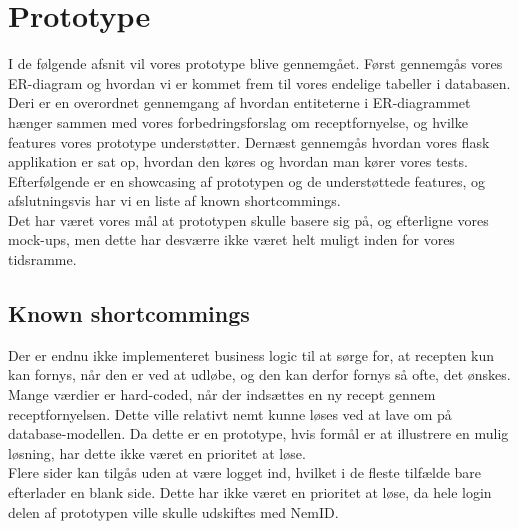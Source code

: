 \section{Prototype}
I de følgende afsnit vil vores prototype blive gennemgået. Først gennemgås vores ER-diagram og hvordan vi er kommet frem til vores endelige tabeller i databasen. Deri er en overordnet gennemgang af hvordan entiteterne i ER-diagrammet hænger sammen med vores forbedringsforslag om receptfornyelse, og hvilke features vores prototype understøtter. Dernæst gennemgås hvordan vores flask applikation er sat op, hvordan den køres og hvordan man kører vores tests. Efterfølgende er en showcasing af prototypen og de understøttede features, og afslutningsvis har vi en liste af known shortcommings.\\
Det har været vores mål at prototypen skulle basere sig på, og efterligne vores mock-ups, men dette har desværre ikke været helt muligt inden for vores tidsramme.






\newpage

\subsection{Known shortcommings}
Der er endnu ikke implementeret business logic til at sørge for, at recepten kun kan fornys, når den er ved at udløbe, og den kan derfor fornys så ofte, det ønskes.\\
Mange værdier er hard-coded, når der indsættes en ny recept gennem receptfornyelsen. Dette ville relativt nemt kunne løses ved at lave om på database-modellen. Da dette er en prototype, hvis formål er at illustrere en mulig løsning, har dette ikke været en prioritet at løse.\\
Flere sider kan tilgås uden at være logget ind, hvilket i de fleste tilfælde bare efterlader en blank side. Dette har ikke været en prioritet at løse, da hele login delen af prototypen ville skulle udskiftes med NemID.\\

